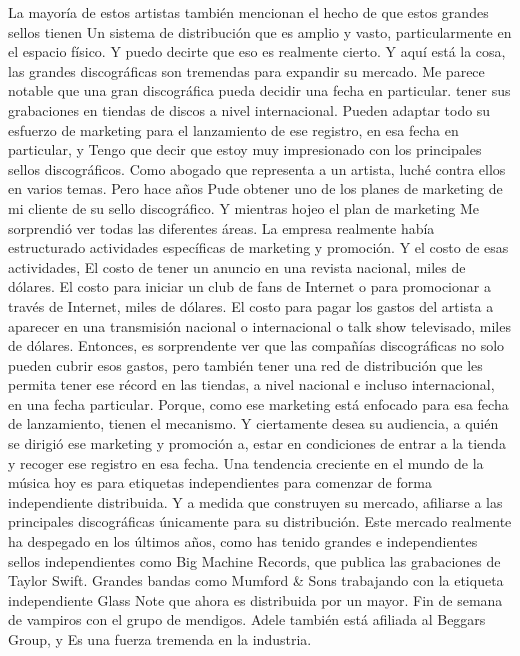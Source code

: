 \documentclass[10pt]{book}
\begin{document}
La mayoría de estos artistas también mencionan el hecho de que estos grandes sellos tienen Un sistema de distribución que es amplio y vasto, particularmente en el espacio físico. Y puedo decirte que eso es realmente cierto. Y aquí está la cosa, las grandes discográficas son tremendas para expandir su mercado. Me parece notable que una gran discográfica pueda decidir una fecha en particular. tener sus grabaciones en tiendas de discos a nivel internacional. Pueden adaptar todo su esfuerzo de marketing para el lanzamiento de ese registro, en esa fecha en particular, y Tengo que decir que estoy muy impresionado con los principales sellos discográficos. Como abogado que representa a un artista, luché contra ellos en varios temas. Pero hace años Pude obtener uno de los planes de marketing de mi cliente de su sello discográfico. Y mientras hojeo el plan de marketing Me sorprendió ver todas las diferentes áreas. La empresa realmente había estructurado actividades específicas de marketing y promoción. Y el costo de esas actividades, El costo de tener un anuncio en una revista nacional, miles de dólares. El costo para iniciar un club de fans de Internet o para promocionar a través de Internet, miles de dólares. El costo para pagar los gastos del artista a aparecer en una transmisión nacional o internacional o talk show televisado, miles de dólares. Entonces, es sorprendente ver que las compañías discográficas no solo pueden cubrir esos gastos, pero también tener una red de distribución que les permita tener ese récord en las tiendas, a nivel nacional e incluso internacional, en una fecha particular. Porque, como ese marketing está enfocado para esa fecha de lanzamiento, tienen el mecanismo. Y ciertamente desea su audiencia, a quién se dirigió ese marketing y promoción a, estar en condiciones de entrar a la tienda y recoger ese registro en esa fecha. Una tendencia creciente en el mundo de la música hoy es para etiquetas independientes para comenzar de forma independiente distribuida. Y a medida que construyen su mercado, afiliarse a las principales discográficas únicamente para su distribución. Este mercado realmente ha despegado en los últimos años, como has tenido grandes e independientes sellos independientes como Big Machine Records, que publica las grabaciones de Taylor Swift. Grandes bandas como Mumford \& Sons trabajando con la etiqueta independiente Glass Note que ahora es distribuida por un mayor. Fin de semana de vampiros con el grupo de mendigos. Adele también está afiliada al Beggars Group, y Es una fuerza tremenda en la industria.\\
\end{document}
